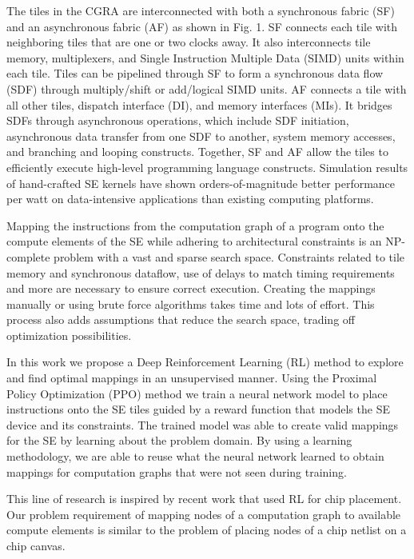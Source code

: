 \documentclass[sigplan,screen]{acmart}
\begin{document}
The tiles in the CGRA are interconnected with both a synchronous fabric (SF) and an asynchronous fabric (AF) as shown in Fig. 1. SF connects each tile with neighboring tiles that are one or two clocks away. 
It also interconnects tile memory, multiplexers, and Single Instruction Multiple Data (SIMD) units within each tile. 
Tiles can be pipelined through SF to form a synchronous data flow (SDF) through multiply/shift or add/logical SIMD units. 
AF connects a tile with all other tiles, dispatch interface (DI), and memory interfaces (MIs). 
It bridges SDFs through asynchronous operations, which include SDF initiation, asynchronous data transfer from one SDF to another, system memory accesses, and branching and looping constructs. 
Together, SF and AF allow the tiles to efficiently execute high-level programming language constructs. 
Simulation results of hand-crafted SE kernels have shown orders-of-magnitude better performance per watt on data-intensive applications than existing computing platforms.

Mapping the instructions from the computation graph of a program onto the compute elements of the SE while adhering to architectural constraints is an NP-complete problem with a vast and sparse search space. 
Constraints related to tile memory and synchronous dataflow, use of delays to match timing requirements and more are necessary to ensure correct execution. 
Creating the mappings manually or using brute force algorithms takes time and lots of effort. 
This process also adds assumptions that reduce the search space, trading off optimization possibilities.  

In this work we propose a Deep Reinforcement Learning (RL) method to explore and find optimal mappings in an unsupervised manner. 
Using the Proximal Policy Optimization (PPO) method we train a neural network model to place instructions onto the SE tiles guided by a reward function that models the SE device and its constraints. 
The trained model was able to create valid mappings for the SE by learning about the problem domain. 
By using a learning methodology, we are able to reuse what the neural network learned to obtain mappings for computation graphs that were not seen during training.  

This line of research is inspired by recent work that used RL for chip placement. 
Our problem requirement of mapping nodes of a computation graph to available compute elements is similar to the problem of placing nodes of a chip netlist on a chip canvas. 
\end{document}
